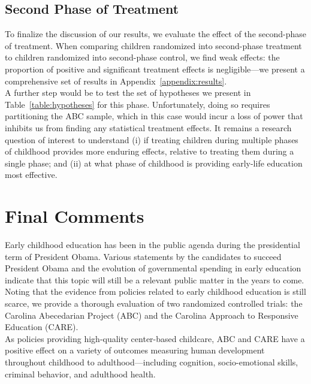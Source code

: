 



\subsection{Second Phase of Treatment} \label{section:second}

\noindent To finalize the discussion of our results, we evaluate the effect of the second-phase of treatment. When comparing children randomized into second-phase treatment to children randomized into second-phase control, we find weak effects: the proportion of positive and significant treatment effects is negligible---we present a comprehensive set of results in Appendix~\ref{appendix:results}.\\

\noindent A further step would be to test the set of hypotheses we present in Table~\ref{table:hypotheses} for this phase. Unfortunately, doing so requires partitioning the ABC sample, which in this case would incur a loss of power that inhibits us from finding any statistical treatment effects. It remains a research question of interest to understand (i) if treating children during multiple phases of childhood provides more enduring effects, relative to treating them during a single phase; and (ii) at what phase of childhood is providing early-life education most effective.

\section{Final Comments} \label{section:conclusion}

\noindent Early childhood education has been in the public agenda during the presidential term of President Obama. Various statements by the candidates to succeed President Obama and the evolution of governmental spending in early education indicate that this topic will still be a relevant public matter in the years to come.\\ 

\noindent Noting that the evidence from policies related to early childhood education is still scarce, we provide a thorough evaluation of two randomized controlled trials: the Carolina Abecedarian Project (ABC) and the Carolina Approach to Responsive Education (CARE).\\ 

\noindent As policies providing high-quality center-based childcare, ABC and CARE have a positive effect on a variety of outcomes measuring human development throughout childhood to adulthood---including cognition, socio-emotional skills, criminal behavior, and adulthood health.\\

